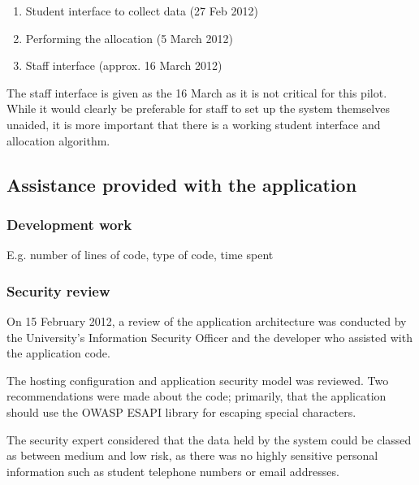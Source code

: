 \documentclass[draft]{scrartcl}
\begin{document}
\begin{enumerate}
  \item Student interface to collect data (27 Feb 2012)
  \item Performing the allocation (5 March 2012)
  \item Staff interface (approx. 16 March 2012)
\end{enumerate}

The staff interface is given as the 16 March as it is not critical for this
pilot. While it would clearly be preferable for staff to set up the system
themselves unaided, it is more important that there is a working student
interface and allocation algorithm.

\subsection{Assistance provided with the application}

\subsubsection{Development work}

E.g. number of lines of code, type of code, time spent



\subsubsection{Security review}

On 15 February 2012, a review of the application architecture was conducted by
the University's Information Security Officer and the developer who assisted
with the application code.


The hosting configuration and application security model was reviewed. Two
recommendations were made about the code; primarily, that the application should
use the OWASP ESAPI library for escaping special characters.

The security expert considered that the data held by the system could be
classed as between medium and low risk, as there was no highly sensitive
personal information such as student telephone numbers or email addresses.
\end{document}
